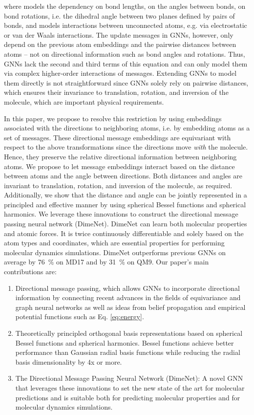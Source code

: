 \documentclass{article} \usepackage{iclr2020_conference,times}
\begin{document}
where  models the dependency on bond lengths,  on the angles between bonds,  on bond rotations, i.e. the dihedral angle between two planes defined by pairs of bonds, and  models interactions between unconnected atoms, e.g. via electrostatic or van der Waals interactions. The update messages in GNNs, however, only depend on the previous atom embeddings and the pairwise distances between atoms -- not on directional information such as bond angles and rotations. Thus, GNNs lack the second and third terms of this equation and can only model them via complex higher-order interactions of messages. Extending GNNs to model them directly is not straightforward since GNNs solely rely on pairwise distances, which ensures their invariance to translation, rotation, and inversion of the molecule, which are important physical requirements.

In this paper, we propose to resolve this restriction by using embeddings associated with the directions to neighboring atoms, i.e. by embedding atoms as a set of messages. These directional message embeddings are equivariant with respect to the above transformations since the directions move \emph{with} the molecule. Hence, they preserve the relative directional information between neighboring atoms. We propose to let message embeddings interact based on the distance between atoms and the angle between directions. Both distances and angles are invariant to translation, rotation, and inversion of the molecule, as required. Additionally, we show that the distance and angle can be jointly represented in a principled and effective manner by using spherical Bessel functions and spherical harmonics. We leverage these innovations to construct the directional message passing neural network (DimeNet). DimeNet can learn both molecular properties and atomic forces. It is twice continuously differentiable and solely based on the atom types and coordinates, which are essential properties for performing molecular dynamics simulations. DimeNet outperforms previous GNNs on average by \SI{76}{\percent} on MD17 and by \SI{31}{\percent} on QM9. Our paper's main contributions are:
\begin{enumerate}[leftmargin=*,itemsep=2pt]
    \item Directional message passing, which allows GNNs to incorporate directional information by connecting recent advances in the fields of equivariance and graph neural networks as well as ideas from belief propagation and empirical potential functions such as Eq. \ref{eq:energy}.
    \item Theoretically principled orthogonal basis representations based on spherical Bessel functions and spherical harmonics. Bessel functions achieve better performance than Gaussian radial basis functions while reducing the radial basis dimensionality by 4x or more.
    \item The Directional Message Passing Neural Network (DimeNet): A novel GNN that leverages these innovations to set the new state of the art for molecular predictions and is suitable both for predicting molecular properties and for molecular dynamics simulations.
\end{enumerate}
\end{document}
